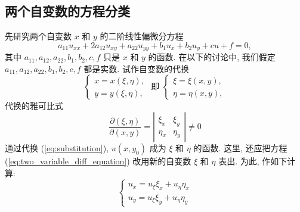 \subsection{两个自变数的方程分类}
先研究两个自变数 $x$ 和 $y$ 的二阶线性偏微分方程
\begin{equation}
    a_{11} u_{x x}+2 a_{12} u_{x y}+a_{22} u_{y y}+b_1 u_x+b_2 u_y+c u+f=0,
    \label{eq:two_variable_diff_equation}
\end{equation}
其中 $a_{11}, a_{12}, a_{22}, b_1, b_2, c, f$ 只是 $x$ 和 $y$ 的函数. 在以下的讨论中, 我们假定 $a_{11}, a_{12}, a_{22}, b_1, b_2, c, f$ 都是实数.
试作自变数的代换
\begin{equation}
\left\{\begin{array} { l } 
{ x = x ( \xi , \eta ) , } \\
{ y = y ( \xi , \eta ) , }
\end{array} \text { 即 } \left\{\begin{array}{l}
\xi=\xi(x, y), \\
\eta=\eta(x, y),
\end{array}\right.\right.
\label{eq:substitution}
\end{equation}
代换的雅可比式
\begin{equation}
    \frac{\partial(\xi, \eta)}{\partial(x, y)} = \left|\begin{array}{ll}
        \xi_x & \xi_y \\
        \eta_x & \eta_y
        \end{array}\right|
    \neq 0
    \label{eq:jacobian}
\end{equation}
通过代换 (\ref{eq:substitution}), $u\left(x, y_0\right)$ 成为 $\xi$ 和 $\eta$ 的函数. 
这里, 还应把方程 (\ref{eq:two_variable_diff_equation}) 改用新的自变数 $\xi$ 和 $\eta$ 表出. 
为此, 作如下计算:
\begin{equation}
    \left\{\begin{array}{l}
        u_x=u_{\xi} \xi_x+u_\eta \eta_x \\
        u_y=u_{\xi} \xi_y+u_\eta \eta_y
        \end{array}\right.
        \label{eq:ux_uy}
\end{equation}

